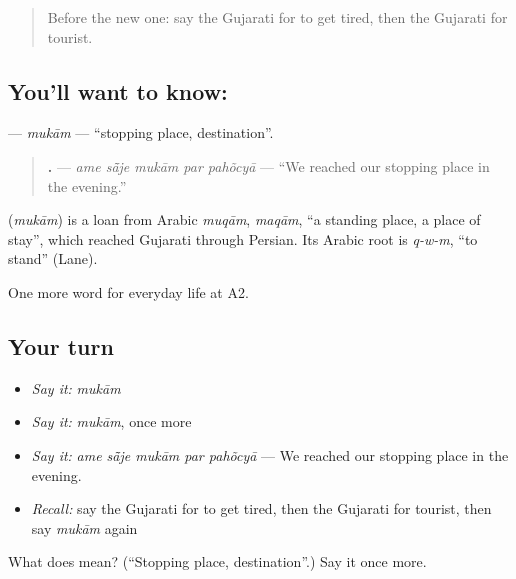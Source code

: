 \begin{quote}
Before the new one: say the Gujarati for to get tired, then the Gujarati for tourist.
\end{quote}

\subsection*{You'll want to know: }
\textbf{} — \emph{mukām} — \textquotedblleft{}stopping place, destination\textquotedblright{}.

\begin{quote}
\textbf{    .} — \emph{ame sā̃je mukām par pahõcyā} — \textquotedblleft{}We reached our stopping place in the evening.\textquotedblright{}
\end{quote}

\begin{cousinweb}
\textbf{} (\emph{mukām}) is a loan from Arabic \emph{muqām}, \emph{maqām}, \textquotedblleft{}a standing place, a place of stay\textquotedblright{}, which reached Gujarati through Persian. Its Arabic root is \emph{q-w-m}, \textquotedblleft{}to stand\textquotedblright{} (Lane).
\end{cousinweb}

\begin{grammarlens}[title={What you've built}]
One more word for everyday life at A2.
\end{grammarlens}

\subsection*{Your turn}
\begin{itemize}
\raggedright
  \item \emph{Say it:} \emph{mukām}
  \item \emph{Say it:} \emph{mukām}, once more
  \item \emph{Say it:} \emph{ame sā̃je mukām par pahõcyā} — We reached our stopping place in the evening.
  \item \emph{Recall:} say the Gujarati for to get tired, then the Gujarati for tourist, then say \emph{mukām} again
\end{itemize}

\begin{tcolorbox}[breakable,colback=teal!4,colframe=teal!35!black,title={Before you move on}]
What does  mean? (\textquotedblleft{}Stopping place, destination\textquotedblright{}.) Say it once more.
\end{tcolorbox}
